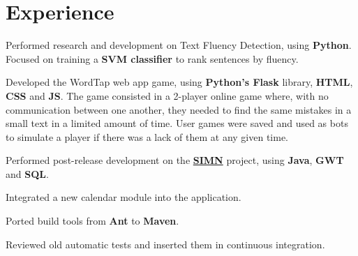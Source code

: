 \documentclass[letterpaper]{deedy-resume} %
\begin{document}
\hfill
%
%
\begin{minipage}[t]{0.64\textwidth} %


\section{Experience}


\vspace{\topsep} %
\begin{tightitemize}
\item Performed research and development on Text Fluency Detection, using \textbf{Python}. Focused on training a \textbf{SVM classifier} to rank sentences by fluency.
\item Developed the WordTap web app game, using \textbf{Python’s Flask} library, \textbf{HTML}, \textbf{CSS} and \textbf{JS}. The game consisted in a 2-player online game where, with no communication between one another, they needed to find the same mistakes in a small text in a limited amount of time. User games were saved and used as bots to simulate a player if there was a lack of them at any given time.
\end{tightitemize}

\sectionspace %



\begin{tightitemize}
\item Performed post-release development on the \textbf{\href{http://www.opensoft.pt/simn/}{SIMN}} project, using \textbf{Java}, \textbf{GWT} and \textbf{SQL}.
\item Integrated a new calendar module into the application.
\item Ported build tools from \textbf{Ant} to \textbf{Maven}.
\item Reviewed old automatic tests and inserted them in continuous integration.
\end{tightitemize}


\end{minipage}
\end{document}
